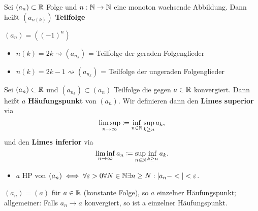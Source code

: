 \begin{subdefinition}
	Sei $ (a_n) \subset \mathbb{R} $ Folge und $ n : \mathbb{N} \to \mathbb{N} $ eine monoton wachsende Abbildung. Dann heißt $ (a_{n(k)}) $ \textbf{Teilfolge}
\end{subdefinition}

\begin{subexample}
	$(a_n) = ( (-1)^n ) $
	\begin{itemize}
		\item $ n(k) = 2k \rightsquigarrow (a_{n_k})$ = Teilfolge der geraden Folgenglieder
		\item $ n(k) = 2k - 1 \rightsquigarrow (a_{n_k})$ = Teilfolge der ungeraden Folgenglieder
	\end{itemize}
\end{subexample}

\begin{subdefinition}
	Sei $ (a_n) \subset \mathbb{R} $ und $ (a_{n_k}) \subset (a_n) $ Teilfolge die gegen $ a \in \mathbb{R} $ konvergiert. Dann heißt $ a $ \textbf{Häufungspunkt} von $ (a_n) $. Wir definieren dann den \textbf{Limes superior} via
	\[\limsup_{n\to\infty} \coloneqq \inf_{n\in\mathbb{N}} \sup_{k\geq n} a_k, \]
	und den \textbf{Limes inferior} via
	\[ \liminf_{n\to\infty} a_n \coloneqq \sup_{n\in\mathbb{N}} \inf_{k\geq n} a_k. \]
	\begin{itemize}
		\item $ a $ HP von $ (a_n)  \iff \forall \varepsilon > 0 \forall N \in \mathbb{N} \exists n \geq N : | a_n - < | < \varepsilon $.
	\end{itemize}
\end{subdefinition}

\begin{subexample}
	$ (a_n) = (a) $ für $ a \in \mathbb{R} $ (konstante Folge), so $ a $ einzelner Häufungspunkt; allgemeiner: Falls $ a_n \to a $ konvergiert,  so ist a einzelner Häufungspunkt.
\end{subexample}

